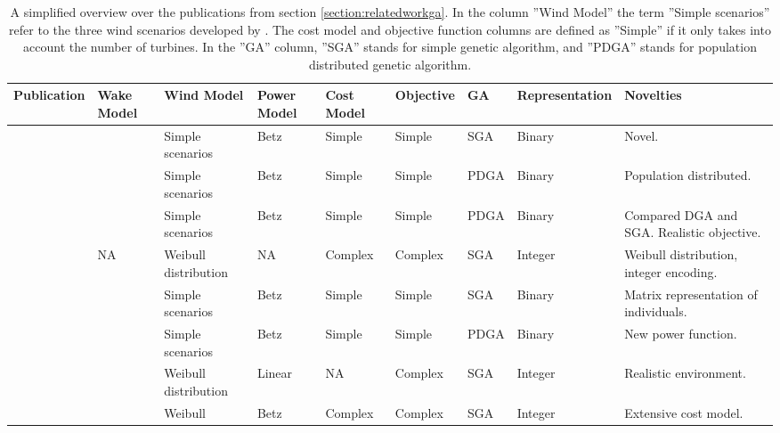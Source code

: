 \tabcolsep=0.1cm
\begin{sidewaystable}
\caption{A simplified overview over the publications from section \ref{section:relatedworkga}. In the column ''Wind Model'' the term ''Simple scenarios'' refer to the three wind scenarios developed by \cite{Mosetti}. The cost model and objective function columns are defined as ''Simple'' if it only takes into account the number of turbines. In the ''GA'' column, ''SGA'' stands for simple genetic algorithm, and ''PDGA'' stands for population distributed genetic algorithm.}
\label{table:overview related work}
\tiny
\begin{center}
\begin{tabular}{l | l | l | l | l | l | l | l | l }
Publication                     & Wake Model       & Wind Model             & Power Model    & Cost Model  & Objective   & GA   & Representation & Novelties \\ 
\hline 
\cite{Mosetti}                & \cite{Jensen}   & Simple scenarios      & Betz \citep{Albring}                & Simple        & Simple        & SGA	& Binary   & Novel. \\
\cite{Grady}                   & \cite{Jensen}   &	 Simple scenarios   &	Betz \citep{Albring}	             & Simple        &	 Simple     & PDGA	& Binary   & Population distributed. \\
\cite{Huang}                  & \cite{Katic}      &	Simple scenarios    & Betz \citep{Albring} 	             & Simple        & Simple       & PDGA	& Binary   & Compared DGA and SGA. Realistic objective. \\
\cite{Mora}                     & NA                   & Weibull distribution  & NA                   & Complex     & Complex    & SGA  & Integer  & Weibull distribution, integer encoding. \\
\cite{Emami}                  & \cite{Jensen}   & Simple scenarios      & Betz \citep{Albring}                & Simple        & Simple        & SGA   & Binary  & Matrix representation of individuals. \\
\cite{Wan}                     & \cite{Jensen}    & Simple scenarios      & Betz \citep{Albring}                & Simple        & Simple       & PDGA   & Binary   & New power function. \\
\cite{Kusiak}                  & \cite{Jensen}    & Weibull distribution  & Linear              & NA             & Complex     & SGA  & Integer   & Realistic environment. \\
\cite{Gonzalez}              & \cite{Frandsen} & Weibull                    & Betz \citep{Albring}                & Complex     & Complex    & SGA   & Integer  & Extensive cost model. \\

\end{tabular}
\end{center}
\end{sidewaystable}
